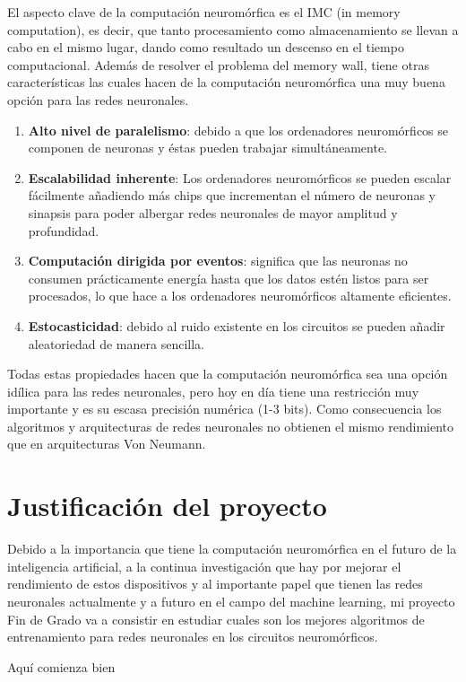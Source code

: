 El aspecto clave de la computación neuromórfica es el IMC (in memory computation), es decir, que tanto procesamiento como almacenamiento se llevan a cabo en el mismo lugar, dando como resultado un descenso en el tiempo computacional. Además de resolver el problema del memory wall, tiene otras características las cuales hacen de la computación neuromórfica una muy buena opción para las redes neuronales. 
\begin{enumerate}
    \item \textbf{Alto nivel de paralelismo}: debido a que los ordenadores neuromórficos se componen de neuronas y éstas pueden trabajar simultáneamente.
    \item \textbf{Escalabilidad inherente}: Los ordenadores neuromórficos se pueden escalar fácilmente añadiendo más chips que incrementan el número de neuronas y sinapsis para poder albergar redes neuronales de mayor amplitud y profundidad.
    \item \textbf{Computación dirigida por eventos}: significa que las neuronas no consumen prácticamente energía hasta que los datos estén listos para ser procesados, lo que hace a los ordenadores neuromórficos altamente eficientes.
    \item \textbf{Estocasticidad}: debido al ruido existente en los circuitos se pueden añadir aleatoriedad de manera sencilla.
\end{enumerate}

Todas estas propiedades hacen que la computación neuromórfica sea una opción idílica para las redes neuronales, pero hoy en día tiene una restricción muy importante y es su escasa precisión numérica (1-3 bits). Como consecuencia los algoritmos y arquitecturas de redes neuronales no obtienen el mismo rendimiento que en arquitecturas Von Neumann.

\section{Justificación del proyecto}
Debido a la importancia que tiene la computación neuromórfica en el futuro de la inteligencia artificial, a la continua investigación que hay por mejorar el rendimiento de estos dispositivos y al importante papel que tienen las redes neuronales actualmente y a futuro en el campo del machine learning, mi proyecto Fin de Grado va a consistir en estudiar cuales son los mejores algoritmos de entrenamiento para redes neuronales en los circuitos neuromórficos. 





\newpage
Aquí comienza bien
